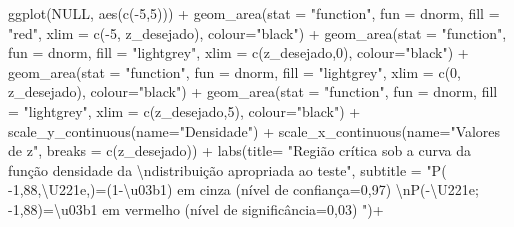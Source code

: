 \documentclass[
]{book}
\newenvironment{Shaded}{\begin{snugshade}}{\end{snugshade}}
\newcommand{\AttributeTok}[1]{\textcolor[rgb]{0.77,0.63,0.00}{#1}}
\newcommand{\ConstantTok}[1]{\textcolor[rgb]{0.00,0.00,0.00}{#1}}
\newcommand{\DecValTok}[1]{\textcolor[rgb]{0.00,0.00,0.81}{#1}}
\newcommand{\FunctionTok}[1]{\textcolor[rgb]{0.00,0.00,0.00}{#1}}
\newcommand{\NormalTok}[1]{#1}
\newcommand{\SpecialCharTok}[1]{\textcolor[rgb]{0.00,0.00,0.00}{#1}}
\newcommand{\StringTok}[1]{\textcolor[rgb]{0.31,0.60,0.02}{#1}}
\begin{document}
\begin{Shaded}
\begin{Highlighting}[]
\FunctionTok{ggplot}\NormalTok{(}\ConstantTok{NULL}\NormalTok{, }\FunctionTok{aes}\NormalTok{(}\FunctionTok{c}\NormalTok{(}\SpecialCharTok{{-}}\DecValTok{5}\NormalTok{,}\DecValTok{5}\NormalTok{))) }\SpecialCharTok{+}
  \FunctionTok{geom\_area}\NormalTok{(}\AttributeTok{stat =} \StringTok{"function"}\NormalTok{, }
            \AttributeTok{fun =}\NormalTok{ dnorm, }
            \AttributeTok{fill =} \StringTok{"red"}\NormalTok{, }
            \AttributeTok{xlim =} \FunctionTok{c}\NormalTok{(}\SpecialCharTok{{-}}\DecValTok{5}\NormalTok{, z\_desejado),}
            \AttributeTok{colour=}\StringTok{"black"}\NormalTok{) }\SpecialCharTok{+}
  \FunctionTok{geom\_area}\NormalTok{(}\AttributeTok{stat =} \StringTok{"function"}\NormalTok{, }
            \AttributeTok{fun =}\NormalTok{ dnorm, }
            \AttributeTok{fill =} \StringTok{"lightgrey"}\NormalTok{, }
            \AttributeTok{xlim =} \FunctionTok{c}\NormalTok{(z\_desejado,}\DecValTok{0}\NormalTok{),}
            \AttributeTok{colour=}\StringTok{"black"}\NormalTok{) }\SpecialCharTok{+}
  \FunctionTok{geom\_area}\NormalTok{(}\AttributeTok{stat =} \StringTok{"function"}\NormalTok{, }
            \AttributeTok{fun =}\NormalTok{ dnorm, }
            \AttributeTok{fill =} \StringTok{"lightgrey"}\NormalTok{, }
            \AttributeTok{xlim =} \FunctionTok{c}\NormalTok{(}\DecValTok{0}\NormalTok{, z\_desejado),}
            \AttributeTok{colour=}\StringTok{"black"}\NormalTok{) }\SpecialCharTok{+}
  \FunctionTok{geom\_area}\NormalTok{(}\AttributeTok{stat =} \StringTok{"function"}\NormalTok{, }
            \AttributeTok{fun =}\NormalTok{ dnorm, }
            \AttributeTok{fill =} \StringTok{"lightgrey"}\NormalTok{, }
            \AttributeTok{xlim =} \FunctionTok{c}\NormalTok{(z\_desejado,}\DecValTok{5}\NormalTok{),}
            \AttributeTok{colour=}\StringTok{"black"}\NormalTok{) }\SpecialCharTok{+}
  \FunctionTok{scale\_y\_continuous}\NormalTok{(}\AttributeTok{name=}\StringTok{"Densidade"}\NormalTok{) }\SpecialCharTok{+}
  \FunctionTok{scale\_x\_continuous}\NormalTok{(}\AttributeTok{name=}\StringTok{"Valores de z"}\NormalTok{, }\AttributeTok{breaks =} \FunctionTok{c}\NormalTok{(z\_desejado))  }\SpecialCharTok{+}
  \FunctionTok{labs}\NormalTok{(}\AttributeTok{title=} 
         \StringTok{"Região crítica sob a curva da função densidade da }\SpecialCharTok{\textbackslash{}n}\StringTok{distribuição apropriada ao teste"}\NormalTok{, }
       \AttributeTok{subtitle =} \StringTok{"P( {-}1,88,\textbackslash{}U221e,)=(1{-}\textbackslash{}u03b1) em cinza (nível de confiança=0,97) }\SpecialCharTok{\textbackslash{}n}\StringTok{P({-}\textbackslash{}U221e; {-}1,88)=\textbackslash{}u03b1 em vermelho (nível de significância=0,03) "}\NormalTok{)}\SpecialCharTok{+}

\end{Highlighting}
\end{Shaded}
\end{document}
